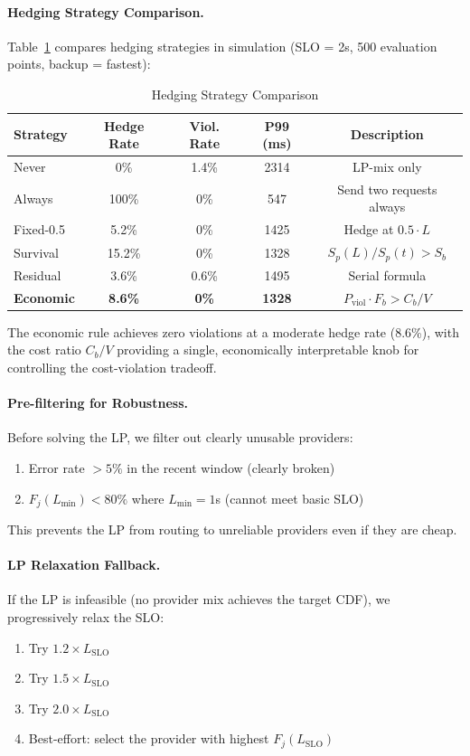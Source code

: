 \paragraph{Hedging Strategy Comparison.}
Table~\ref{tab:hedging_strategies} compares hedging strategies in simulation (SLO = 2s, 500 evaluation points, backup = fastest):
\begin{table}[h]
\caption{Hedging Strategy Comparison}
\label{tab:hedging_strategies}
\begin{center}
\begin{tabular}{lcccc}
\toprule
Strategy & Hedge Rate & Viol. Rate & P99 (ms) & Description \\
\midrule
Never & 0\% & 1.4\% & 2314 & LP-mix only \\
Always & 100\% & 0\% & 547 & Send two requests always \\
Fixed-0.5 & 5.2\% & 0\% & 1425 & Hedge at $0.5 \cdot L$ \\
Survival & 15.2\% & 0\% & 1328 & $S_p(L)/S_p(t) > S_b$ \\
Residual & 3.6\% & 0.6\% & 1495 & Serial formula \\
\textbf{Economic} & \textbf{8.6\%} & \textbf{0\%} & \textbf{1328} & $P_\text{viol} \cdot F_b > C_b/V$ \\
\bottomrule
\end{tabular}
\end{center}
\end{table}

The economic rule achieves zero violations at a moderate hedge rate (8.6\%), with the cost ratio $C_b/V$ providing a single, economically interpretable knob for controlling the cost-violation tradeoff.

\paragraph{Pre-filtering for Robustness.}
Before solving the LP, we filter out clearly unusable providers:
\begin{enumerate}
    \item Error rate $> 5\%$ in the recent window (clearly broken)
    \item $F_j(L_{\min}) < 80\%$ where $L_{\min} = 1$s (cannot meet basic SLO)
\end{enumerate}
This prevents the LP from routing to unreliable providers even if they are cheap.

\paragraph{LP Relaxation Fallback.}
If the LP is infeasible (no provider mix achieves the target CDF), we progressively relax the SLO:
\begin{enumerate}
    \item Try $1.2 \times L_{\text{SLO}}$
    \item Try $1.5 \times L_{\text{SLO}}$
    \item Try $2.0 \times L_{\text{SLO}}$
    \item Best-effort: select the provider with highest $F_j(L_{\text{SLO}})$
\end{enumerate}

